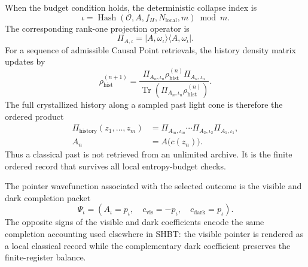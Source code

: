 \documentclass[11pt,letterpaper]{article}
\theoremstyle{plain}
\DeclareMathOperator{\Tr}{Tr}
\begin{document}
When the budget condition holds, the deterministic collapse index is
\begin{equation}
\label{eq:section-seven-collapse-index}
 \boxed{
 \iota
 =
 \operatorname{Hash}\!\left(
 \mathcal O,
 A,
 f_H,
 N_{\text{local}},
 m
 \right)
 \bmod m.
 }
\end{equation}
The corresponding rank-one projection operator is
\begin{equation}
\label{eq:section-seven-history-projection}
 \boxed{
 \Pi_{A,\iota}
 =
 |A,\omega_{\iota}\rangle\langle A,\omega_{\iota}|.
 }
\end{equation}
For a sequence of admissible Causal Point retrievals, the history density matrix
updates by
\begin{equation}
\label{eq:section-seven-history-update}
 \rho_{\text{hist}}^{(n+1)}
 =
 \frac{
 \Pi_{A_n,\iota_n}\rho_{\text{hist}}^{(n)}\Pi_{A_n,\iota_n}}
 {\Tr\!\left(
 \Pi_{A_n,\iota_n}\rho_{\text{hist}}^{(n)}
 \right)}.
\end{equation}
The full crystallized history along a sampled past light cone is therefore the
ordered product
\begin{equation}
\label{eq:section-seven-full-history-projector}
 \begin{aligned}
 \Pi_{\text{history}}(z_1,\dots,z_m)
 &=
 \Pi_{A_m,\iota_m}\cdots\Pi_{A_2,\iota_2}\Pi_{A_1,\iota_1},\\
 A_n&=A\bigl(c(z_n)\bigr).
 \end{aligned}
\end{equation}
Thus a classical past is not retrieved from an unlimited archive.  It is the
finite ordered record that survives all local entropy-budget checks.

The pointer wavefunction associated with the selected outcome is the visible
and dark completion packet
\begin{equation}
\label{eq:section-seven-pointer-wavefunction}
 \boxed{
 \Psi_{\iota}
 =
 \left(
 A_{\iota}=p_{\iota},
 \quad
 c_{\text{vis}}=-p_{\iota},
 \quad
 c_{\text{dark}}=p_{\iota}
 \right).
 }
\end{equation}
The opposite signs of the visible and dark coefficients encode the same
completion accounting used elsewhere in SHBT: the visible pointer is rendered
as a local classical record while the complementary dark coefficient preserves
the finite-register balance.
\end{document}

